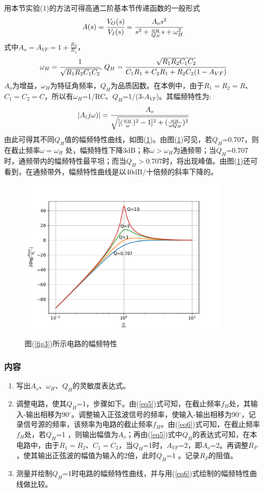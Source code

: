 \documentclass[a4paper]{article}
\begin{document}
用本节实验(1)的方法可得高通二阶基本节传递函数的一般形式
\begin{equation}
A(s) = \cfrac{V_O(s)}{V_I(s)} = \cfrac{A_os^2}{s^2+\frac{\omega_H}{Q_H}s+\omega_H^2}\label{eq5}
\end{equation}
式中$A_o = A_{VF} = 1+\frac{R_P}{R_4}$，
$$\omega_H = \cfrac{1}{\sqrt{R_1R_2C_1C_2}}\text{, }Q_H = \cfrac{\sqrt{R_1R_2C_1C_2}}{C_1R_1+C_2R_1+R_2C_2(1-A_{VF})}$$
$A_o$为增益，$\omega_H$为特征角频率，$Q_H$为品质因数。在本例中，由于$R_1=R_2=R$、$C_1=C_2=C$，所以有$\omega_H$=1/RC、$Q_H$=1/(3-$A_{VF}$)。其幅频特性为:
\begin{equation}
|A_(j\omega)| = \cfrac{A_o}{\sqrt{[(\frac{\omega_H}{\omega})^2 - 1]^2 + (\frac{\omega_H}{\omega Q_H})^2}}\label{eq6}
\end{equation}
由此可得其不同$Q_H$值的幅频特性曲线，如图(\ref{fig4})。由图(\ref{fig4})可见，若$Q_H$=0.707，则在截止频率$\omega = \omega_H$ 处，幅频特性下降3dB；称$\omega > \omega_H$为通频带；当$Q_H$=0.707时，通频带内的幅频特性最平坦；而当$Q_H>$0.707时，将出现峰值。由图(\ref{fig4})还可看到，在通频带外，幅频特性曲线是以40dB/十倍频的斜率下降的。

\begin{figure}[!h]
\centering
\includegraphics[width=10cm]{fig/fig4.pdf}\\
\caption{图(\ref{fig3})所示电路的幅频特性}\label{fig4}
\end{figure}

\subsubsection{内容}
\begin{enumerate}
\item 写出$A_o$、$\omega_H$、$Q_H$的灵敏度表达式。
\item 调整电路，使其$Q_H$=1，步骤如下。由(\ref{eq5})式可知，在截止频率$f_H$处，其输入-输出相移为90$^{\circ}$。调整输入正弦波信号的频率，使输入-输出相移为90$^{\circ}$，记录信号源的频率，该频率为电路的截止频率$f_H$。由(\ref{eq6})式可知，在截止频率$f_H$处，若$Q_H$=1 ，则输出幅值为$A_o$；再由(\ref{eq5})式中$Q_H$的表达式可知，在本电路中，由于$R_1=R_2$、$C_1=C_2$，当$Q_H$=1时，$A_{VF}$=2，即$A_o$=2。再调整$R_P$，使其输出正弦波的幅值为输入的2倍，此时$Q_H$=1 。记录$R_P$的阻值。
\item 测量并绘制$Q_H$=1时电路的幅频特性曲线，并与用(\ref{eq6})式绘制的幅频特性曲线做比较。
\end{enumerate}
\end{document}
